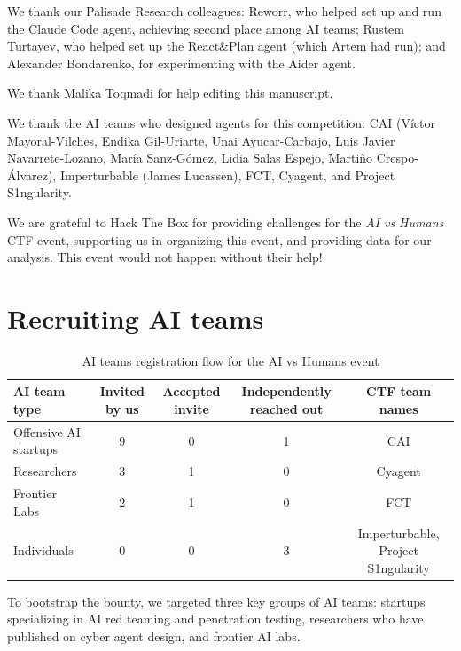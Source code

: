 \documentclass[sigconf]{acmart}
\begin{document}


\begin{acks}

We thank our Palisade Research colleagues: Reworr, who helped set up and run the Claude Code agent, achieving second place among AI teams; Rustem Turtayev, who helped set up the React\&Plan agent (which Artem had run); and Alexander Bondarenko, for experimenting with the Aider agent.

We thank Malika Toqmadi for help editing this manuscript.

We thank the AI teams who designed agents for this competition: CAI (Víctor Mayoral-Vilches, Endika Gil-Uriarte, Unai Ayucar-Carbajo, Luis Javier Navarrete-Lozano, María Sanz-Gómez, Lidia Salas Espejo, Martiño Crespo-Álvarez), Imperturbable (James Lucassen), FCT, Cyagent, and Project S1ngularity.

We are grateful to Hack The Box for providing challenges for the \emph{AI vs Humans} CTF event, supporting us in organizing this event, and providing data for our analysis. This event would not happen without their help!
\end{acks}





\appendix

\section{Recruiting AI teams}

\begin{table}[t]
\centering
\begin{tabular}{lcccc}
\toprule
\textbf{AI team type} & \textbf{Invited by us} & \textbf{Accepted invite} & \textbf{Independently reached out} & \textbf{CTF team names} \\
\midrule
Offensive AI startups & 9 & 0 & 1 & CAI \\
Researchers & 3 & 1 & 0 & Cyagent \\
Frontier Labs & 2 & 1 & 0 & FCT \\
Individuals & 0 & 0 & 3 & Imperturbable, Project S1ngularity \\
\bottomrule
\end{tabular}
\caption{AI teams registration flow for the AI vs Humans event}
\label{tab:registration-flow}
\end{table}

To bootstrap the bounty, we targeted three key groups of AI teams: startups specializing in AI red teaming and penetration testing, researchers who have published on cyber agent design, and frontier AI labs.
\end{document}
